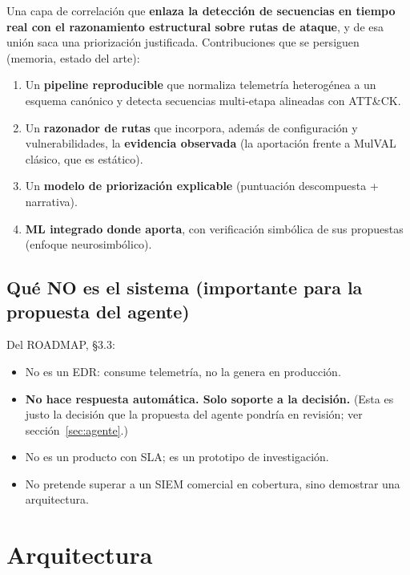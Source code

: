 \documentclass[11pt,a4paper]{article}
\begin{document}
\begin{clave}
Una capa de correlación que \textbf{enlaza la detección de secuencias en tiempo real con el razonamiento
estructural sobre rutas de ataque}, y de esa unión saca una priorización justificada. Contribuciones
que se persiguen (memoria, estado del arte):
\begin{enumerate}
  \item Un \textbf{pipeline reproducible} que normaliza telemetría heterogénea a un esquema canónico y
        detecta secuencias multi-etapa alineadas con ATT\&CK.
  \item Un \textbf{razonador de rutas} que incorpora, además de configuración y vulnerabilidades,
        la \textbf{evidencia observada} (la aportación frente a MulVAL clásico, que es estático).
  \item Un \textbf{modelo de priorización explicable} (puntuación descompuesta + narrativa).
  \item \textbf{ML integrado donde aporta}, con verificación simbólica de sus propuestas
        (enfoque neurosimbólico).
\end{enumerate}
\end{clave}

\subsection{Qué NO es el sistema (importante para la propuesta del agente)}
Del ROADMAP, §3.3:
\begin{itemize}
  \item No es un EDR: consume telemetría, no la genera en producción.
  \item \textbf{No hace respuesta automática. Solo soporte a la decisión.} \textcolor{violeta}{\small (Esta
        es justo la decisión que la propuesta del agente pondría en revisión; ver sección~\ref{sec:agente}.)}
  \item No es un producto con SLA; es un prototipo de investigación.
  \item No pretende superar a un SIEM comercial en cobertura, sino demostrar una arquitectura.
\end{itemize}

\newpage
\section{Arquitectura}\label{sec:arquitectura}
\end{document}
